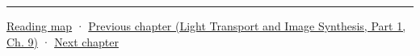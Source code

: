 \begin{center}\rule{0.5\linewidth}{0.5pt}\end{center}

\hyperref[volume-reading-map]{Reading map} · \href{../04-Light-Transport-and-Image-Synthesis-P01/main.pdf\#nameddest=04-visual-computing-ii-ch035-a-complete-renderer-as-an-executable-forward-model}{Previous chapter (Light Transport and Image Synthesis, Part 1, Ch. 9)} · \hyperref[04-visual-computing-ii-ch037-gaussian-splatting-and-editable-captured-worlds]{Next chapter}
